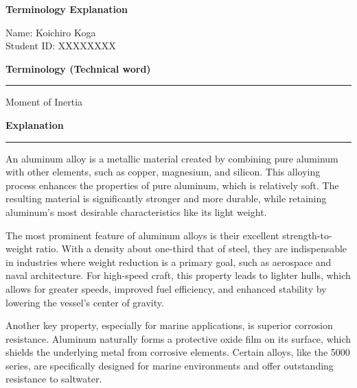 \documentclass[11pt, dvipdfmx]{jsarticle}
\begin{document}
\pagestyle{empty}

\fontsize{10.5pt}{12.5pt}\selectfont
\linespread{1.1}

\begin{center}
    \Large{\textbf{Terminology Explanation}}
\end{center}

\vspace{1cm} %

\noindent Name: Koichiro Koga \\
Student ID: XXXXXXXX
\vspace{1.5cm} %

\noindent\large{\textbf{Terminology (Technical word)}}
\hrule
\vspace{0.3cm}
\noindent Moment of Inertia

\vspace{1cm} %

\noindent\large{\textbf{Explanation}}
\hrule
\vspace{0.3cm}
An aluminum alloy is a metallic material created by combining pure aluminum with other elements, such as copper, magnesium, and silicon. This alloying process enhances the properties of pure aluminum, which is relatively soft. The resulting material is significantly stronger and more durable, while retaining aluminum's most desirable characteristics like its light weight.

The most prominent feature of aluminum alloys is their excellent strength-to-weight ratio. With a density about one-third that of steel, they are indispensable in industries where weight reduction is a primary goal, such as aerospace and naval architecture. For high-speed craft, this property leads to lighter hulls, which allows for greater speeds, improved fuel efficiency, and enhanced stability by lowering the vessel's center of gravity.

Another key property, especially for marine applications, is superior corrosion resistance. Aluminum naturally forms a protective oxide film on its surface, which shields the underlying metal from corrosive elements. Certain alloys, like the 5000 series, are specifically designed for marine environments and offer outstanding resistance to saltwater.
\end{document}
